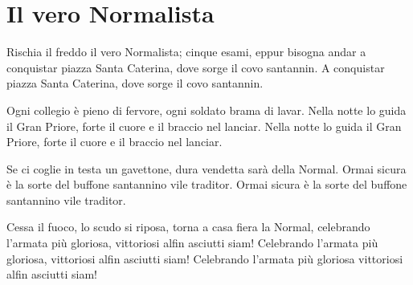 \section{Il vero Normalista}
\begin{canzone}
Rischia il freddo il vero Normalista;
cinque esami, eppur bisogna andar
a conquistar piazza Santa Caterina,
dove sorge il covo santannin.
A conquistar piazza Santa Caterina,
dove sorge il covo santannin.

\clearpage
Ogni collegio è pieno di fervore,
ogni soldato brama di lavar.
Nella notte lo guida il Gran Priore,
forte il cuore e il braccio nel lanciar.
Nella notte lo guida il Gran Priore,
forte il cuore e il braccio nel lanciar.

Se ci coglie in testa un gavettone,
dura vendetta sarà della Normal.
Ormai sicura è la sorte del buffone
santannino vile traditor.
Ormai sicura è la sorte del buffone
santannino vile traditor.

Cessa il fuoco, lo scudo si riposa,
torna a casa fiera la Normal,
celebrando l'armata più gloriosa,
vittoriosi alfin asciutti siam!
Celebrando l'armata più gloriosa,
vittoriosi alfin asciutti siam!
Celebrando l'armata più gloriosa
vittoriosi alfin asciutti siam!
\end{canzone}
